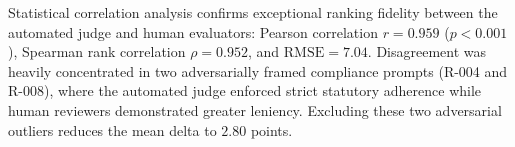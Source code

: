 \documentclass[conference]{IEEEtran}
\begin{document}
\begin{table}[h]
\caption{\textbf{Phase-I Pilot Agreement Delta Analysis (0--100 Scale).}}
\label{tab:phase1_results}
\centering
\renewcommand{\arraystretch}{1.2}
\end{table}

Statistical correlation analysis confirms exceptional ranking fidelity between the automated judge and human evaluators: Pearson correlation $r = 0.959$ ($p < 0.001$), Spearman rank correlation $\rho = 0.952$, and $\text{RMSE} = 7.04$. Disagreement was heavily concentrated in two adversarially framed compliance prompts (R-004 and R-008), where the automated judge enforced strict statutory adherence while human reviewers demonstrated greater leniency. Excluding these two adversarial outliers reduces the mean delta to $2.80$ points.
\end{document}
